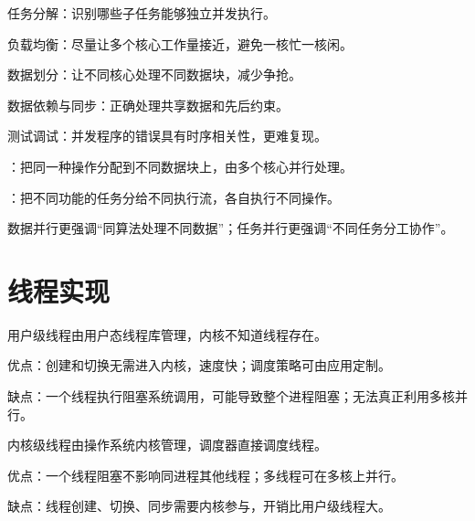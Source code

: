 \begin{points}
  \item 任务分解：识别哪些子任务能够独立并发执行。
  \item 负载均衡：尽量让多个核心工作量接近，避免一核忙一核闲。
  \item 数据划分：让不同核心处理不同数据块，减少争抢。
  \item 数据依赖与同步：正确处理共享数据和先后约束。
  \item 测试调试：并发程序的错误具有时序相关性，更难复现。
\end{points}


\begin{points}
  \item {}：把同一种操作分配到不同数据块上，由多个核心并行处理。
  \item {}：把不同功能的任务分给不同执行流，各自执行不同操作。
  \item 数据并行更强调“同算法处理不同数据”；任务并行更强调“不同任务分工协作”。
\end{points}


\section{线程实现}
\begin{points}
  \item 用户级线程由用户态线程库管理，内核不知道线程存在。
  \item 优点：创建和切换无需进入内核，速度快；调度策略可由应用定制。
  \item 缺点：一个线程执行阻塞系统调用，可能导致整个进程阻塞；无法真正利用多核并行。
\end{points}


\begin{points}
  \item 内核级线程由操作系统内核管理，调度器直接调度线程。
  \item 优点：一个线程阻塞不影响同进程其他线程；多线程可在多核上并行。
  \item 缺点：线程创建、切换、同步需要内核参与，开销比用户级线程大。
\end{points}


